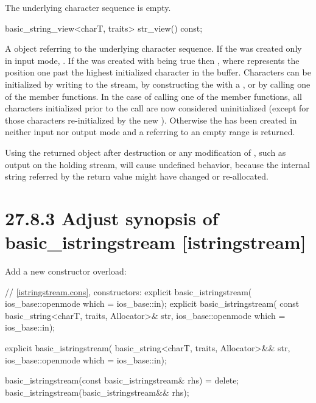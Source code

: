 \documentclass[ebook,11pt,article]{memoir}
\begin{document}
\begin{insrt}
\begin{itemdescr}
\pnum
\postcondition The underlying character sequence is empty.
\end{itemdescr}

\begin{itemdecl}
basic_string_view<charT, traits> str_view() const;
\end{itemdecl}
\begin{itemdescr}
\pnum
\returns A  object referring to the  underlying character sequence. If the  was created only in input mode,  . If the  was created with  being true then , where  represents the position one past the highest initialized character in the buffer. Characters can be initialized by writing to the stream, by constructing the  with a , or by calling one of the  member functions. In the case of calling one of the  member functions, all characters initialized prior to the call are now considered uninitialized (except for those characters re-initialized by the new ). Otherwise the  has been created in neither input nor output mode and a  referring to an empty range is returned. 

\pnum
\enternote
Using the returned object after destruction or any modification of , such as output on the holding stream, will cause undefined behavior, because the internal string referred by the return value might have changed or re-allocated. 
\exitnote
\end{itemdescr}

\end{insrt}
\section{27.8.3 Adjust synopsis of basic\_istringstream [istringstream]}
Add a new constructor overload:
\begin{codeblock}
    // \ref{istringstream.cons}, constructors:
    explicit basic_istringstream(
      ios_base::openmode which = ios_base::in);
    explicit basic_istringstream(
      const basic_string<charT, traits, Allocator>& str,
      ios_base::openmode which = ios_base::in);
\end{codeblock}
\begin{addedblock}
\begin{codeblock}
    explicit basic_istringstream(
      basic_string<charT, traits, Allocator>&& str,
      ios_base::openmode which = ios_base::in);
\end{codeblock}
\end{addedblock}
\begin{codeblock}
    basic_istringstream(const basic_istringstream& rhs) = delete;
    basic_istringstream(basic_istringstream&& rhs);
\end{codeblock}
\end{document}

